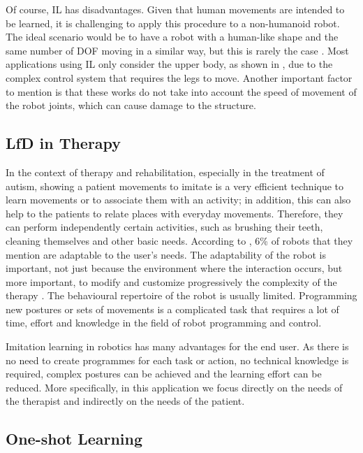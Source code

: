 \documentclass[thesis]{mas_proposal}
\begin{document}
    Of course, IL has disadvantages. Given that human movements are intended to be learned, it is challenging to apply this procedure to a non-humanoid robot. The ideal scenario would be to have a robot with a human-like shape and the same number of DOF moving in a similar way, but this is rarely the case \cite{Ravichandar2020}. Most applications using IL only consider the upper body, as shown in \cite{VanPerre2015}, due to the complex control system that requires the legs to move. Another important factor to mention is that these works do not take into account the speed of movement of the robot joints, which can cause damage to the structure. 
    
    \subsection{LfD in Therapy}
    
    In the context of therapy and rehabilitation, especially in the treatment of autism, showing a patient movements to imitate is a very efficient technique to learn movements or to associate them with an activity; in addition, this can also help to the patients to relate places with everyday movements. Therefore, they can perform independently certain activities, such as brushing their teeth, cleaning themselves and other basic needs. According to \cite{Cabibihan2013}, 6\% of robots that they mention are adaptable to the user's needs. The adaptability of the robot is important, not just because the environment where the interaction occurs, but more important, to modify and customize progressively the complexity of the therapy \cite{Dickstein2018}. The behavioural repertoire of the robot is usually limited. Programming new postures or sets of movements is a complicated task that requires a lot of time, effort and knowledge in the field of robot programming and control.
    
    Imitation learning in robotics has many advantages for the end user. As there is no need to create programmes for each task or action, no technical knowledge is required, complex postures can be achieved and the learning effort can be reduced. More specifically, in this application we focus directly on the needs of the therapist \cite{Ravichandar2020, Kulikovskiy2021} and indirectly on the needs of the patient. 	
    
    \subsection{One-shot Learning}
    
\end{document}
